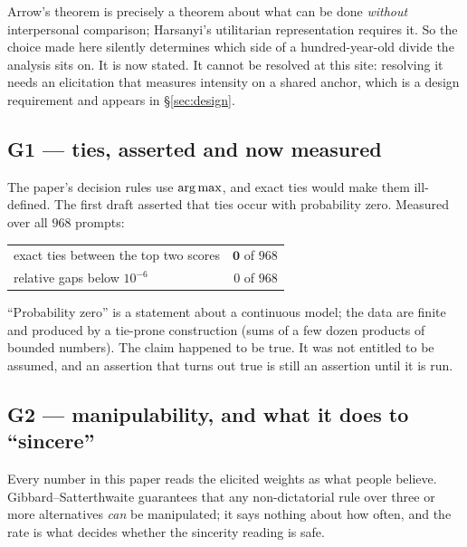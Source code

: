  Arrow's theorem is
precisely a theorem about what can be done \emph{without} interpersonal
comparison; Harsanyi's utilitarian representation requires it. So the choice made
here silently determines which side of a hundred-year-old divide the analysis
sits on. It is now stated. It cannot be resolved at this site: resolving it needs
an elicitation that measures intensity on a shared anchor, which is a design
requirement and appears in §\ref{sec:design}.


\subsection{G1 --- ties, asserted and now measured}

The paper's decision rules use $\operatorname*{arg\,max}$, and exact ties would make them
ill-defined. The first draft asserted that ties occur with probability zero.
Measured over all $968$ prompts:

\begin{table}[H]\centering\small
\begin{tabular}{lr}
\toprule
exact ties between the top two scores & $\mathbf{0}$ of $968$\\
relative gaps below $10^{-6}$ & $0$ of $968$\\
\bottomrule
\end{tabular}
\end{table}

 ``Probability zero'' is a
statement about a continuous model; the data are finite and produced by a
tie-prone construction (sums of a few dozen products of bounded numbers). The
claim happened to be true. It was not entitled to be assumed, and an assertion
that turns out true is still an assertion until it is run.

\subsection{G2 --- manipulability, and what it does to ``sincere''}

Every number in this paper reads the elicited weights as what people believe.
Gibbard--Satterthwaite guarantees that any non-dictatorial rule over three or
more alternatives \emph{can} be manipulated; it says nothing about how often, and
the rate is what decides whether the sincerity reading is safe.


